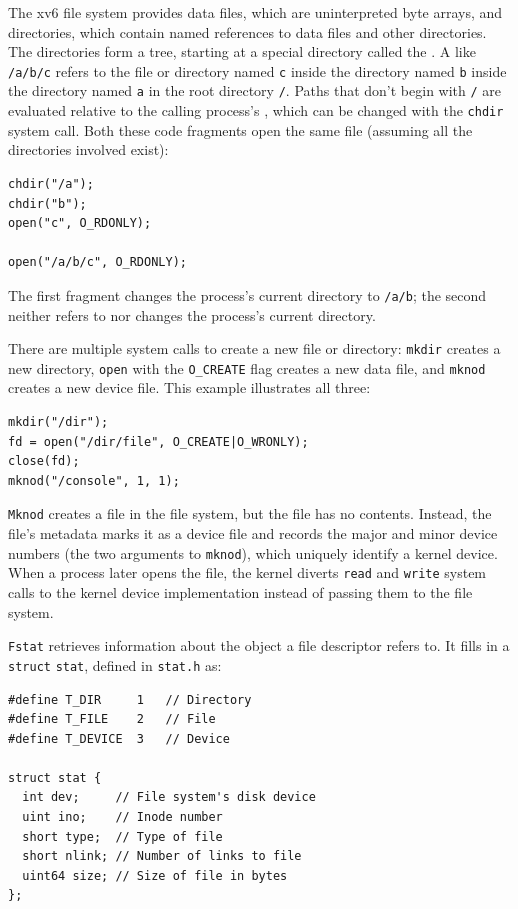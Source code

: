 The xv6 file system provides data files,
which are uninterpreted byte arrays,
and directories, which
contain named references to data files and other directories.
The directories form a tree, starting
at a special directory called the 
.
A 
like
\lstinline{/a/b/c}
refers to the file or directory named
\lstinline{c}
inside the directory named
\lstinline{b}
inside the directory named
\lstinline{a}
in the root directory
\lstinline{/}.
Paths that don't begin with
\lstinline{/}
are evaluated relative to the calling process's
,
which can be changed with the
\lstinline{chdir}
system call.
Both these code fragments open the same file
(assuming all the directories involved exist):
\begin{lstlisting}[]
chdir("/a");
chdir("b");
open("c", O_RDONLY);

open("/a/b/c", O_RDONLY);
\end{lstlisting}
The first fragment changes the process's current directory to
\lstinline{/a/b};
the second neither refers to nor changes the process's current directory.

There are multiple system calls to create a new file or directory:
\lstinline{mkdir}
creates a new directory,
\lstinline{open}
with the
\lstinline{O_CREATE}
flag creates a new data file,
and
\lstinline{mknod}
creates a new device file.
This example illustrates all three:
\begin{lstlisting}[]
mkdir("/dir");
fd = open("/dir/file", O_CREATE|O_WRONLY);
close(fd);
mknod("/console", 1, 1);
\end{lstlisting}
\lstinline{Mknod}
creates a file in the file system,
but the file has no contents.
Instead, the file's metadata marks it as a device file
and records the major and minor device numbers
(the two arguments to 
\lstinline{mknod}),
which uniquely identify a kernel device.
When a process later opens the file, the kernel
diverts
\lstinline{read}
and
\lstinline{write}
system calls to the kernel device implementation
instead of passing them to the file system.

\lstinline{Fstat}
retrieves information about the object a file
descriptor refers to.
It fills in a
\lstinline{struct}
\lstinline{stat},
defined in
\lstinline{stat.h}
as:
\begin{lstlisting}[]
#define T_DIR     1   // Directory
#define T_FILE    2   // File
#define T_DEVICE  3   // Device

struct stat {
  int dev;     // File system's disk device
  uint ino;    // Inode number
  short type;  // Type of file
  short nlink; // Number of links to file
  uint64 size; // Size of file in bytes
};
\end{lstlisting}

